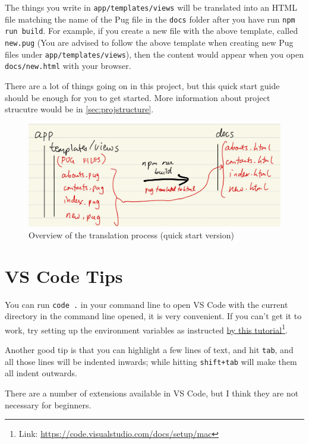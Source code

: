 The things you write in \texttt{app/templates/views} will be translated into an HTML file matching the name of the Pug file in the \texttt{docs} folder after you have run \texttt{npm run build}. For example, if you create a new file with the above template, called \texttt{new.pug} (You are advised to follow the above template when creating new Pug files under \texttt{app/templates/views}), then the content would appear when you open \texttt{docs/new.html} with your browser. 

There are a lot of things going on in this project, but this quick start guide should be enough for you to get started. More information about project strucutre would be in \cref{sec:projstructure}.

\begin{figure}[h]
\centering
\includegraphics[width=15cm]{images/chn1-half-translation.png}
\caption{Overview of the translation process (quick start version)}
\end{figure}

\section{VS Code Tips}

You can run \texttt{code .} in your command line to open VS Code with the current directory in the command line opened, it is very convenient. If you can't get it to work, try setting up the environment variables as instructed \href{https://code.visualstudio.com/docs/setup/mac}{by this tutorial}\footnote{Link: \url{https://code.visualstudio.com/docs/setup/mac}}.
\vspace{6mm}

Another good tip is that you can highlight a few lines of text, and hit \texttt{tab}, and all those lines will be indented inwards; while hitting \texttt{shift+tab} will make them all indent outwards.
\vspace{6mm}

There are a number of extensions available in VS Code, but I think they are not necessary for beginners.